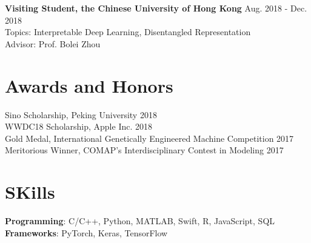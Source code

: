 \documentclass{academiccv}
\begin{document}
\textbf{Visiting Student, the Chinese University of Hong Kong} \hfill Aug. 2018 - Dec. 2018  \\
Topics: Interpretable Deep Learning, Disentangled Representation \\
Advisor: Prof. Bolei Zhou \\

\section*{Awards and Honors}


Sino Scholarship, Peking University \hfill 2018  \\
WWDC18 Scholarship, Apple Inc. \hfill 2018  \\
Gold Medal, International Genetically Engineered Machine Competition 
\hfill 2017  \\

Meritorious Winner, COMAP's Interdisciplinary Contest in Modeling \hfill 2017  \\

\section*{SKills}
\textbf{Programming}: C/C++, Python, MATLAB, Swift, R, JavaScript, SQL \\
\textbf{Frameworks}: PyTorch, Keras, TensorFlow\\


\end{document}
